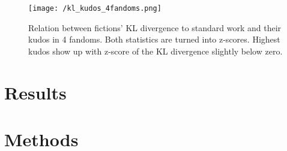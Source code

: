 \documentclass[11pt]{article} %
\begin{document}
\begin{figure}[htbp]
\begin{center}
\texttt{[image: /kl\_kudos\_4fandoms.png]}
\caption{Relation between fictions' KL divergence to standard work and their kudos in 4 fandoms. Both statistics are turned into z-scores. Highest kudos show up with z-score of the KL divergence slightly below zero.}
\label{fig:kl_kudos}
\end{center}
\end{figure}






\section{Results} %
\label{sec:results}


\section{Methods} %
\label{sec:methods}


\printbibliography
    
\end{document}

